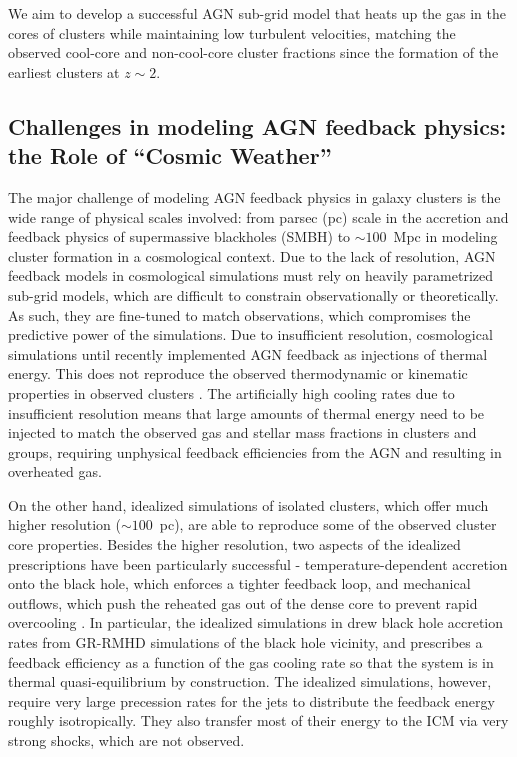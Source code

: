 \documentclass[letterpaper,11pt]{article}
\begin{document}
We aim to develop a successful AGN sub-grid model that heats up the gas in the cores of clusters while maintaining low turbulent velocities, matching the observed  cool-core and non-cool-core cluster fractions since the formation of the earliest clusters at $z\sim 2$.

\subsection{Challenges in modeling AGN feedback physics: the Role of ``Cosmic Weather''}

The major challenge of modeling AGN feedback physics in galaxy clusters is the wide range of physical scales involved: from parsec (pc) scale in the accretion and feedback physics of supermassive blackholes (SMBH) to $\sim 100$~Mpc in modeling cluster formation in a cosmological context. Due to the lack of resolution, AGN feedback models in cosmological simulations must rely on heavily parametrized sub-grid models, which are difficult to constrain observationally or theoretically. As such, they are fine-tuned to match observations, which compromises the predictive power of the simulations. Due to insufficient resolution, cosmological simulations until recently implemented AGN feedback as injections of thermal energy. This does not reproduce the observed thermodynamic or kinematic properties in observed clusters \citep{Lau2017}. The artificially high cooling rates due to insufficient resolution means that large amounts of thermal energy need to be injected to match the observed gas and stellar mass fractions in clusters and groups, requiring unphysical feedback efficiencies from the AGN and resulting in overheated gas.

On the other hand, idealized simulations of isolated clusters, which offer much higher resolution ($\sim 100$~pc), are able to reproduce some of the observed cluster core properties. Besides the higher resolution, two aspects of the idealized prescriptions have been particularly successful - temperature-dependent accretion onto the black hole, which enforces a tighter feedback loop, and mechanical outflows, which push the reheated gas out of the dense core to prevent rapid overcooling \citep[e.g.,][]{Meece2015, Li2015}. In particular, the idealized simulations in \citet{Gaspari2015} drew black hole accretion rates from GR-RMHD simulations of the black hole vicinity, and prescribes a feedback efficiency as a function of the gas cooling rate so that the system is in thermal quasi-equilibrium by construction. The idealized simulations, however, require very large precession rates for the jets to distribute the feedback energy roughly isotropically. They also transfer most of their energy to the ICM via very strong shocks, which are not observed. 
\end{document}
